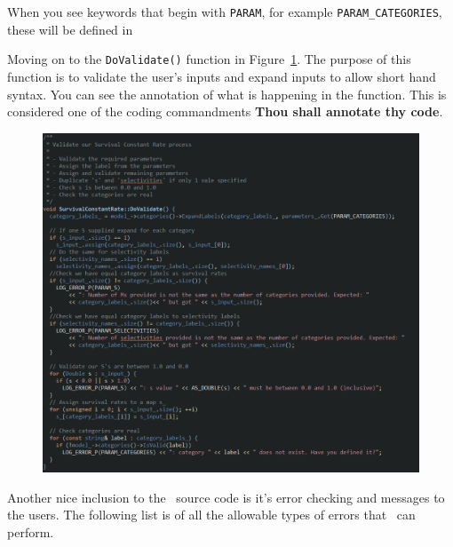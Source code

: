 When you see keywords that begin with \texttt{PARAM}, for example \texttt{PARAM\_CATEGORIES}, these will be defined in 

Moving on to the \texttt{DoValidate()} function in Figure~\ref{fig:validate}. The purpose of this function is to validate the user's inputs and expand inputs to allow short hand syntax. You can see the annotation of what is happening in the function. This is considered one of the coding commandments \textbf{Thou shall annotate thy code}.

\begin{figure}[!ht]
	\centering
	\includegraphics[scale=0.6]{Figures/validate.png}
	\caption{}\label{fig:validate}
\end{figure}

Another nice inclusion to the \CNAME\ source code is it's error checking and messages to the users. The following list is of all the allowable types of errors that \CNAME\ can perform.

